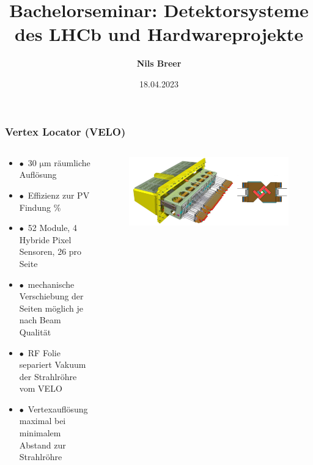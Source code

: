 \documentclass[aspectratio=1610, 12pt, xcolor=dvipsnames]{beamer}
\title{Bachelorseminar: Detektorsysteme des LHCb und Hardwareprojekte}
\author[N.Breer]{\textbf{Nils Breer}}
\institute{TU Dortmund}
\date{18.04.2023}
\begin{document}
\maketitle

\begin{frame}\frametitle{Vertex Locator (VELO)}
  \begin{columns}
    \begin{column}[c]{0.48\textwidth}
      \begin{itemize}
        \item $\bullet$\, 30 $\si{\micro\metre}$ räumliche Auflösung
        \item $\bullet$\, Effizienz zur PV Findung \%
        \item $\bullet$\, 52 Module, 4 Hybride Pixel Sensoren, 26 pro Seite
        \item $\bullet$\, mechanische Verschiebung der Seiten möglich je nach Beam Qualität
        \item $\bullet$\, RF Folie separiert Vakuum der Strahlröhre vom VELO
        \item $\bullet$\, Vertexauflösung maximal bei minimalem Abstand zur Strahlröhre
      \end{itemize}
    \end{column}
    \begin{column}[c]{0.48\textwidth}
      \begin{figure}
        \centering
        \includegraphics[width=\textwidth]{plots/velo.png}
      \end{figure}
    \end{column}
  \end{columns}
\end{frame}
\end{document}
